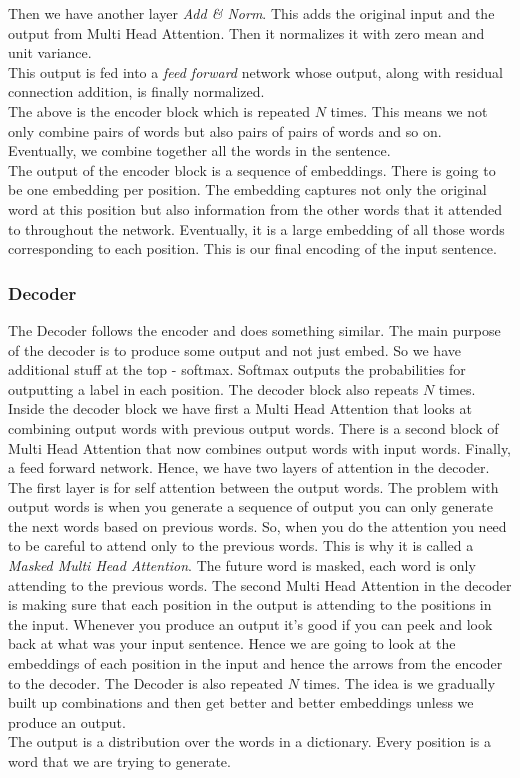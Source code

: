 \documentclass{article}
\begin{document}
Then we  have another layer \textit{Add \& Norm}. This adds the original input and the output from Multi Head Attention. Then it normalizes it with zero mean and unit variance.\\
This output is fed into a \textit{feed forward} network whose output, along with residual connection addition, is finally normalized.\\
The above is the encoder block which is repeated $N$ times. This means we not only combine pairs of words but also pairs of pairs of words and so on. Eventually, we combine together all the words in the sentence. \\
The output of the encoder block is a sequence of embeddings. There is going to be one embedding per position. The embedding captures not only the original word at this position but also information from the other words that it attended to throughout the network. Eventually, it is a large embedding of all those words corresponding to each position. This is our final encoding of the input sentence. \\

\subsubsection{Decoder}
The Decoder follows the encoder and does something similar. The main purpose of the decoder is to produce some output and not just embed. So we have additional stuff at the top - softmax. Softmax outputs the probabilities for outputting a label in each position. The decoder block also repeats $N$ times. \\
Inside the decoder block we have first a Multi Head Attention that looks at combining output words with previous output words. There is a second block of Multi Head Attention that now combines output words with input words. Finally, a feed forward network.  Hence, we have two layers of attention in the decoder.  The first layer is for self attention between the output words. The problem with output words is when you generate a sequence of output you can only generate the next words based on previous words. So, when you do the attention you need to be careful to attend only to the previous words. This is why it is called a \textit{Masked Multi Head Attention}. The future word is masked, each word is only attending to the previous words. The second Multi Head Attention in the decoder is making sure that each position in the output is attending to the positions in the input. Whenever you produce an output it's good if you can peek and look back at what was your input sentence. Hence we are going to look at the embeddings of each position in the input and hence the arrows from the encoder to the decoder. The Decoder is also repeated $N$ times. The idea is we gradually built up combinations and then get better and better embeddings unless we produce an output. \\
The output is a distribution over the words in a dictionary. Every position is a word that we are trying to generate.
\end{document}
